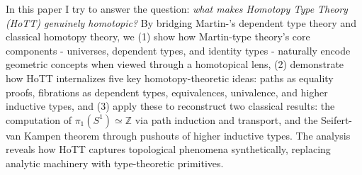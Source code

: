 \noindent
In this paper I try to answer the question: \emph{what makes Homotopy Type Theory (HoTT) genuinely homotopic?} 
By bridging Martin-\Lof's dependent type theory and classical homotopy theory, 
we (1) show how Martin-\Lof type theory's core components - universes, dependent types, and identity types - naturally encode geometric concepts when viewed through a homotopical lens, 
(2) demonstrate how HoTT internalizes five key homotopy-theoretic ideas: paths as equality proofs, fibrations as dependent types, equivalences, univalence, and higher inductive types, and 
(3) apply these to reconstruct two classical results: the computation of $\pi_1(S^1) \simeq \mathbb{Z}$ via path induction and transport, and the Seifert-van Kampen theorem through pushouts of higher inductive types. 
The analysis reveals how HoTT captures topological phenomena synthetically, replacing analytic machinery with type-theoretic primitives.